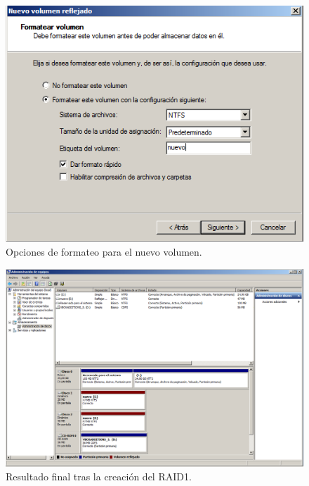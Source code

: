 \begin{figure}[H]
    \begin{center}
        \includegraphics[scale=0.6]{Imagenes/paso7}
        \caption{Opciones de formateo para el nuevo volumen.}
        \label{fig16}
    \end{center}
\end{figure}

\begin{figure}[H]
    \begin{center}
        \advance\leftskip-2.1cm
        \includegraphics[scale=0.45]{Imagenes/final}
        \caption{Resultado final tras la creación del RAID1.}
        \label{fig17}
    \end{center}
\end{figure}

